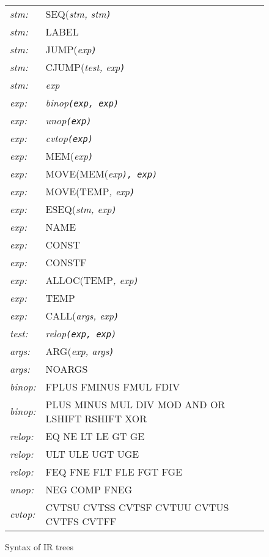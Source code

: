 \begin{figure}[t]
\begin{center}\tt
\begin{tabular}{ll}
\it stm\rm:	& SEQ(\it stm, stm\tt) \\
\it stm\rm:	& LABEL \\
\it stm\rm:	& JUMP(\it exp\tt) \\
\it stm\rm:	& CJUMP(\it test, exp\tt) \\
\it stm\rm:	& \it exp \\[1ex]

\it exp\rm:	& \it binop\/\tt(\it exp, exp\tt) \\
\it exp\rm:	& \it unop\/\tt(\it exp\tt) \\
\it exp\rm:	& \it cvtop\/\tt(\it exp\tt) \\
\it exp\rm:	& MEM(\it exp\tt) \\
\it exp\rm:	& MOVE(MEM(\it exp\tt)\it, exp\tt) \\
\it exp\rm:	& MOVE(TEMP\it, exp\tt) \\
\it exp\rm:	& ESEQ(\it stm, exp\tt) \\
\it exp\rm:	& NAME \\
\it exp\rm:	& CONST \\
\it exp\rm:	& CONSTF \\
\it exp\rm:	& ALLOC(TEMP\it, exp\tt) \\
\it exp\rm:	& TEMP \\
\it exp\rm:	& CALL(\it args, exp\tt) \\[1ex]

\it test\rm:	& \it relop\/\tt(\it exp, exp\tt) \\[1ex]

\it args\rm:	& ARG(\it exp, args\tt) \\
\it args\rm:	& NOARGS \\[1ex]

\it binop\rm:	& FPLUS  FMINUS  FMUL  FDIV \\
\it binop\rm:	& PLUS   MINUS   MUL   DIV  MOD  AND  OR  LSHIFT  RSHIFT  XOR \\[1ex]

\it relop\rm:	& EQ   NE   LT   LE   GT   GE \\
\it relop\rm:	& ULT  ULE  UGT  UGE \\
\it relop\rm:	& FEQ  FNE  FLT  FLE  FGT  FGE \\[1ex]

\it unop\rm:	& NEG    COMP   FNEG \\
\it cvtop\rm:	& CVTSU  CVTSS  CVTSF  CVTUU  CVTUS  CVTFS  CVTFF \\
\end{tabular}
\end{center}
\caption{Syntax of IR trees\label{fig:syntax}}
\end{figure}


